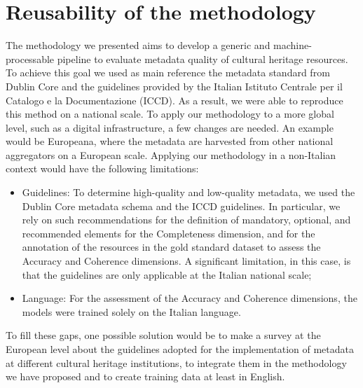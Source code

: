 \documentclass[epsfig,a4paper,12pt,titlepage]{book}
\newcommand{\clearemptydoublepage}{\newpage{\pagestyle{empty}\cleardoublepage}}
\begin{document}
\section{Reusability of the methodology}

The methodology we presented aims to develop a generic and machine-processable pipeline to evaluate metadata quality of cultural heritage resources. To achieve this goal we used as main reference the metadata standard from Dublin Core and the guidelines provided by the Italian Istituto Centrale per il Catalogo e la Documentazione (ICCD). As a result, we were able to reproduce this  method on a national scale. To apply our methodology to a more global level, such as a digital infrastructure, a few changes are needed. An example would be Europeana, where the metadata are harvested from other national aggregators on a European scale. Applying our methodology in a non-Italian context would have the following limitations:

\begin{itemize}
    \item Guidelines: To determine high-quality and low-quality metadata, we used the Dublin Core metadata schema and the ICCD guidelines. In particular, we rely on such recommendations for the definition of mandatory, optional, and recommended elements for the Completeness dimension, and for the annotation of the resources in the gold standard dataset to assess the Accuracy and Coherence dimensions. A significant limitation, in this case, is that the guidelines are only applicable at the Italian national scale;
    \item Language: For the assessment of the Accuracy and Coherence dimensions, the models were trained solely on the Italian language.
\end{itemize}

To fill these gaps, one possible solution would be to make a survey at the European level about the guidelines adopted for the implementation of metadata at different cultural heritage institutions, to integrate them in the methodology we have proposed and to create training data at least in English.
\color{black}
\clearemptydoublepage



\thispagestyle{empty}

\makeatletter
{}



\clearemptydoublepage
\end{document}
